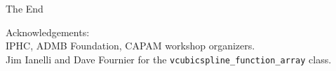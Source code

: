\documentclass{beamer}
\begin{document}
%
 
 
 
\begin{frame}[t]
\centerline{The End}
Acknowledgements:\\
\vfill 
IPHC, ADMB Foundation, CAPAM workshop organizers.\\
\vfill
Jim Ianelli and Dave Fournier for the \texttt{vcubicspline\_function\_array} class. 
\end{frame}
\end{document}

